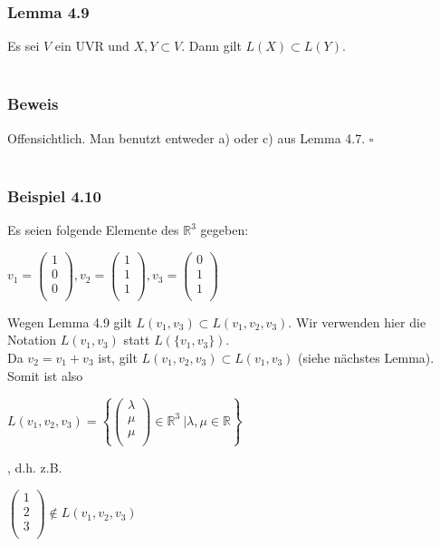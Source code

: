 \documentclass{article}
\begin{document}
\subsubsection*{Lemma 4.9}
Es sei $V$ ein UVR und $X, Y \subset V$. Dann gilt $L(X) \subset L(Y)$.\\
\\
\subsubsection*{Beweis}
Offensichtlich. Man benutzt entweder a) oder c) aus Lemma 4.7. $\square$ \\
\\
\subsubsection*{Beispiel 4.10}
Es seien folgende Elemente des $\mathbb{R}^3$ gegeben: \\
\begin{center}
    $v_1 = \begin{pmatrix}
        1 \\
        0 \\
        0 \\
    \end{pmatrix}, v_2 = \begin{pmatrix}
        1 \\
        1 \\
        1 \\
    \end{pmatrix}, v_3 = \begin{pmatrix}
        0 \\
        1 \\
        1 \\
    \end{pmatrix}$ \\
\end{center}
Wegen Lemma 4.9 gilt $L(v_1, v_3) \subset L(v_1, v_2, v_3)$. Wir verwenden hier die Notation $L(v_1, v_3)$ statt $L(\{v_1, v_3\})$. \\
Da $v_2 = v_1 + v_3$ ist, gilt $L(v_1, v_2, v_3) \subset L(v_1, v_3)$ (siehe nächstes Lemma). \\
Somit ist also \\
\begin{center}
    $L(v_1, v_2, v_3) = \left\{ \begin{pmatrix}
        \lambda \\
        \mu \\
        \mu \\
    \end{pmatrix} \in \mathbb{R}^3 \ | \lambda, \mu \in \mathbb{R}  \right\}$ \\
\end{center}
, d.h. z.B. \\
\begin{center}
    $\begin{pmatrix}
        1 \\
        2 \\
        3 \\
    \end{pmatrix} \notin L(v_1, v_2, v_3)$ \\  
\end{center}
\end{document}
